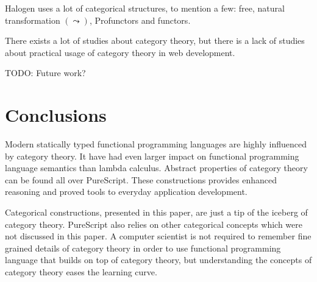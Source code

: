 \documentclass[article]{aaltoseries}
\begin{document}
Halogen uses a lot of categorical structures, to mention a few: free, natural
transformation $(\leadsto)$, Profunctors and functors.
 
There exists a lot of studies about category theory, but there is a lack of
studies about practical usage of category theory in web development.

TODO: Future work?


\section{Conclusions}

Modern statically typed functional programming languages are highly influenced
by category theory. It have had even larger impact on functional programming
language semantics than lambda calculus. Abstract properties of category theory
can be found all over PureScript. These constructions provides enhanced
reasoning and proved tools to everyday application development.
 
Categorical constructions, presented in this paper, are just a tip of the
iceberg of category theory. PureScript also relies on other categorical concepts
which were not discussed in this paper. A computer scientist is not required to
remember fine grained details of category theory in order to use functional
programming language that builds on top of category theory, but understanding
the concepts of category theory eases the learning curve.




\end{document}
